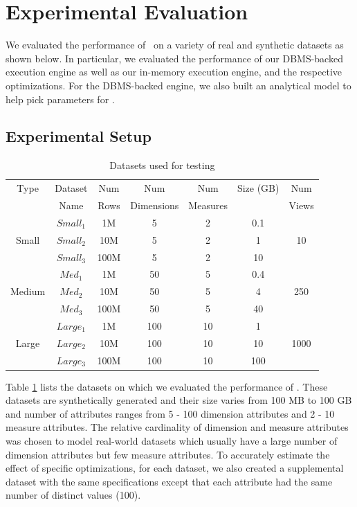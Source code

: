 
\section{Experimental Evaluation}

We evaluated the performance of \VizRecDB\ on a variety of real and synthetic
datasets as shown below. 
In particular, we evaluated the performance of our
DBMS-backed execution engine as well as our in-memory execution engine, and the
respective optimizations. 
For the DBMS-backed engine, we also built an analytical model to help pick
parameters for \VizRecDB.

\subsection{Experimental Setup}

\begin{table}[htb]
  \centering \scriptsize
  \begin{tabular}{|c|c|c|c|c|c|c|} \hline
  Type & Dataset & Num  & Num  & Num  & Size (GB) &
  Num \\
  & Name & Rows & Dimensions &  Measures & & Views \\ \hline 
   & $Small_1$ & 1M & 5 & 2 &  0.1 & \\ 
  Small & $Small_2$ & 10M & 5 & 2 &  1 & 10\\ 
   & $Small_3$ & 100M & 5 & 2 &  10 & \\ \hline
   & $Med_1$ & 1M & 50 & 5 &  0.4 & \\
  Medium & $Med_2$ & 10M & 50 & 5 &  4 & 250\\ 
   & $Med_3$ & 100M & 50 & 5 &  40 & \\ \hline
   & $Large_1$ & 1M & 100 & 10 &  1 & \\
  Large & $Large_2$ & 10M & 100 & 10 &  10 & 1000\\
   & $Large_3$ & 100M & 100 & 10 &  100 & \\ \hline
  \end{tabular}
  \caption{Datasets used for testing}
  \label{tab:datasets} 
\end{table}

Table \ref{tab:datasets} lists the datasets on which we evaluated the
performance of \VizRecDB. These datasets are synthetically generated and their size
varies from 100 MB to 100 GB and number of attributes ranges from 5 - 100 dimension attributes and 2 -
 10 measure attributes. The relative cardinality of dimension and measure attributes
was chosen to model real-world datasets which usually have a large number of
dimension attributes but few measure attributes. To accurately estimate the
effect of specific optimizations, for each dataset, we also created a
supplemental dataset with the same specifications except that each attribute had
the same number of distinct values (100).

